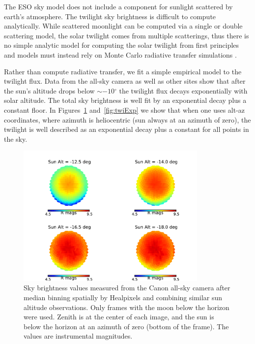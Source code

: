 \documentclass[]{spie}
\newcommand\degree{{^\circ}}
\begin{document}
The ESO sky model does not include a component for sunlight scattered by earth's atmosphere.  The twilight sky brightness is difficult to compute analytically.  While scattered moonlight can be computed via a single or double scattering model, the solar twilight comes from multiple scatterings, thus there is no simple analytic model for computing the solar twilight from first principles and models must instead rely on Monte Carlo radiative transfer simulations \cite{Patat06}.

Rather than compute radiative transfer, we fit a simple empirical model to the twilight flux.  Data from the all-sky camera as well as other sites show that after the sun's altitude drops below $\sim-10\degree$ the twilight flux decays exponentially with solar altitude. The total sky brightness is well fit by an exponential decay plus a constant floor.  In Figures~\ref{fig:twiSky} and~\ref{fig:twiExp} we show that when one uses alt-az coordinates, where azimuth is heliocentric (sun always at an azimuth of zero), the twilight is well described as an exponential decay plus a constant for all points in the sky.  %



\begin{figure}[ht]
  \begin{center}
  \includegraphics[height=7cm]{plots/twiExamples.pdf}
  \end{center}
  \caption{Sky brightness values measured from the Canon all-sky camera after median binning spatially by Healpixels and combining similar sun altitude observations. Only frames with the moon below the horizon were used. Zenith is at the center of each image, and the sun is below the horizon at an azimuth of zero (bottom of the frame). The values are instrumental magnitudes.  \label{fig:twiSky}}
\end{figure}
\end{document}
